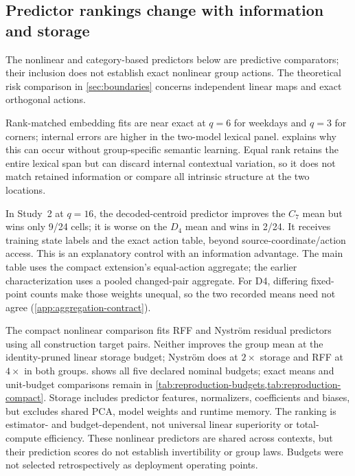 \documentclass[10pt]{article}
\begin{document}
\subsection{Predictor rankings change with information and storage}
\label{sec:characterization}
The nonlinear and category-based predictors below are predictive comparators; their inclusion does not establish exact nonlinear group actions. The theoretical risk comparison in \cref{sec:boundaries} concerns independent linear maps and exact orthogonal actions.

Rank-matched embedding fits are near exact at $q=6$ for weekdays and $q=3$ for corners; internal errors are higher in the two-model lexical panel.  explains why this can occur without group-specific semantic learning. Equal rank retains the entire lexical span but can discard internal contextual variation, so it does not match retained information or compare all intrinsic structure at the two locations.

In Study~2 at $q=16$, the decoded-centroid predictor improves the $C_7$ mean but wins only 9/24 cells; it is worse on the $D_4$ mean and wins in 2/24. It receives training state labels and the exact action table, beyond source-coordinate/action access. This is an explanatory control with an information advantage. The main table uses the compact extension's equal-action aggregate; the earlier characterization uses a pooled changed-pair aggregate. For D4, differing fixed-point counts make those weights unequal, so the two recorded means need not agree (\cref{app:aggregation-contract}).

The compact nonlinear comparison fits RFF and Nystr\"om residual predictors using all construction target pairs. Neither improves the group mean at the identity-pruned linear storage budget; Nystr\"om does at $2\times$ storage and RFF at $4\times$ in both groups.  shows all five declared nominal budgets; exact means and unit-budget comparisons remain in \cref{tab:reproduction-budgets,tab:reproduction-compact}. Storage includes predictor features, normalizers, coefficients and biases, but excludes shared PCA, model weights and runtime memory. The ranking is estimator- and budget-dependent, not universal linear superiority or total-compute efficiency. These nonlinear predictors are shared across contexts, but their prediction scores do not establish invertibility or group laws. Budgets were not selected retrospectively as deployment operating points.
\end{document}
